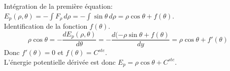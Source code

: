 \documentclass[]{book}
\theoremstyle{definition}
\begin{document}
Int\'egration de la premi\`ere \'equation: $E_p(\rho,\theta) = -\int{F_{\rho}\, d\rho} = -\int{\sin \theta\, d\rho} = \rho \cos \theta + f(\theta)$.\\
Identification de la fonction $f(\theta)$. 
$$\rho \cos \theta = -\frac{dE_p(\rho,\theta)}{d\theta} = -\frac{d(-\rho \sin \theta + f(\theta)}{dy} = \rho \cos \theta + f'(\theta)$$
Donc $f'(\theta) = 0$ et $f(\theta) = C^{ste}$.\\

L'\'energie potentielle d\'eriv\'ee est donc $E_p = \rho \cos \theta + C^{ste}$.
\end{document}

